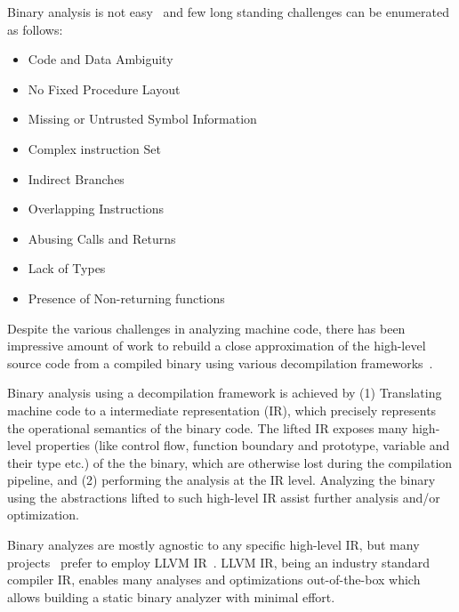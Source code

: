 Binary analysis is not easy~\cite{Meng:2016} and few long standing challenges
can be enumerated as follows:

\begin{itemize}
    \item Code and Data Ambiguity
    \item No Fixed Procedure Layout
    \item Missing or Untrusted Symbol Information
    \item Complex instruction Set
    \item Indirect Branches
    \item Overlapping Instructions
    \item Abusing Calls and Returns
    \item Lack of Types
    \item Presence of Non-returning functions
\end{itemize}

Despite the various challenges in analyzing machine code, there has been
impressive amount of work to rebuild a close approximation of the high-level
source code from a compiled binary using various decompilation
frameworks~\cite{McSema:Recon14,Remill,Angr1,BAP:CAV11,Radare2,FCD,BitBlaze:2008,hexray,Fokin:2011,eschulte2018bed,katz2018rnn,Schwartz:2013,IDA,mctoll,revgen}.

Binary analysis using a decompilation framework is achieved by (1) Translating machine code to a intermediate
representation (IR), which precisely represents the operational semantics of
the binary code. The lifted IR exposes many high-level properties (like control
    flow, function boundary and prototype, variable and their type etc.) of the
the binary, which are otherwise lost during the compilation pipeline, and (2)
  performing the analysis at the IR level.  Analyzing the binary using the
  abstractions lifted to such high-level IR assist further analysis and/or
  optimization. 

Binary analyzes are mostly agnostic to any specific high-level IR, but many
projects~\cite{McSema:Recon14,Remill,FCD,reopt,mctoll} prefer to employ LLVM
IR~\cite{Lattner:2004}. LLVM IR, being an industry standard compiler IR,
  enables many analyses and optimizations out-of-the-box which allows building
  a static binary analyzer with minimal effort.

